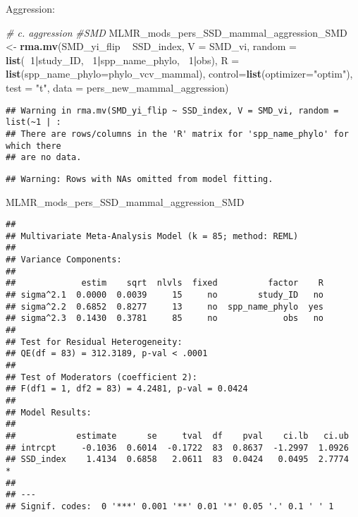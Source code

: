\documentclass[]{article}
\newenvironment{Shaded}{\begin{snugshade}}{\end{snugshade}}
\newcommand{\KeywordTok}[1]{\textcolor[rgb]{0.13,0.29,0.53}{\textbf{#1}}}
\newcommand{\DataTypeTok}[1]{\textcolor[rgb]{0.13,0.29,0.53}{#1}}
\newcommand{\DecValTok}[1]{\textcolor[rgb]{0.00,0.00,0.81}{#1}}
\newcommand{\StringTok}[1]{\textcolor[rgb]{0.31,0.60,0.02}{#1}}
\newcommand{\CommentTok}[1]{\textcolor[rgb]{0.56,0.35,0.01}{\textit{#1}}}
\newcommand{\OperatorTok}[1]{\textcolor[rgb]{0.81,0.36,0.00}{\textbf{#1}}}
\newcommand{\NormalTok}[1]{#1}
\begin{document}
Aggression:

\begin{Shaded}
\begin{Highlighting}[]
    \CommentTok{# c. aggression}
    \CommentTok{#SMD}
\NormalTok{    MLMR_mods_pers_SSD_mammal_aggression_SMD <-}\StringTok{ }\KeywordTok{rma.mv}\NormalTok{(SMD_yi_flip }\OperatorTok{~}\StringTok{ }\NormalTok{SSD_index, }\DataTypeTok{V =}\NormalTok{ SMD_vi, }
                                          \DataTypeTok{random =} \KeywordTok{list}\NormalTok{(}\OperatorTok{~}\DecValTok{1}\OperatorTok{|}\NormalTok{study_ID, }\OperatorTok{~}\DecValTok{1}\OperatorTok{|}\NormalTok{spp_name_phylo, }\OperatorTok{~}\DecValTok{1}\OperatorTok{|}\NormalTok{obs), }
                                          \DataTypeTok{R =} \KeywordTok{list}\NormalTok{(}\DataTypeTok{spp_name_phylo=}\NormalTok{phylo_vcv_mammal), }\DataTypeTok{control=}\KeywordTok{list}\NormalTok{(}\DataTypeTok{optimizer=}\StringTok{"optim"}\NormalTok{), }
                                          \DataTypeTok{test =} \StringTok{"t"}\NormalTok{, }\DataTypeTok{data =}\NormalTok{ pers_new_mammal_aggression)}
\end{Highlighting}
\end{Shaded}

\begin{verbatim}
## Warning in rma.mv(SMD_yi_flip ~ SSD_index, V = SMD_vi, random = list(~1 | :
## There are rows/columns in the 'R' matrix for 'spp_name_phylo' for which there
## are no data.
\end{verbatim}

\begin{verbatim}
## Warning: Rows with NAs omitted from model fitting.
\end{verbatim}

\begin{Shaded}
\begin{Highlighting}[]
\NormalTok{    MLMR_mods_pers_SSD_mammal_aggression_SMD}
\end{Highlighting}
\end{Shaded}

\begin{verbatim}
## 
## Multivariate Meta-Analysis Model (k = 85; method: REML)
## 
## Variance Components:
## 
##             estim    sqrt  nlvls  fixed          factor    R 
## sigma^2.1  0.0000  0.0039     15     no        study_ID   no 
## sigma^2.2  0.6852  0.8277     13     no  spp_name_phylo  yes 
## sigma^2.3  0.1430  0.3781     85     no             obs   no 
## 
## Test for Residual Heterogeneity:
## QE(df = 83) = 312.3189, p-val < .0001
## 
## Test of Moderators (coefficient 2):
## F(df1 = 1, df2 = 83) = 4.2481, p-val = 0.0424
## 
## Model Results:
## 
##            estimate      se     tval  df    pval    ci.lb   ci.ub 
## intrcpt     -0.1036  0.6014  -0.1722  83  0.8637  -1.2997  1.0926    
## SSD_index    1.4134  0.6858   2.0611  83  0.0424   0.0495  2.7774  * 
## 
## ---
## Signif. codes:  0 '***' 0.001 '**' 0.01 '*' 0.05 '.' 0.1 ' ' 1
\end{verbatim}
\end{document}
